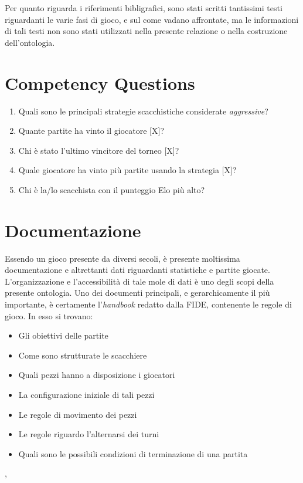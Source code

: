 \documentclass[12pt]{book}
\begin{document}
Per quanto riguarda i riferimenti bibligrafici, sono stati scritti
tantissimi testi riguardanti le varie fasi di gioco, e sul come vadano
affrontate, ma le informazioni di tali testi non sono stati utilizzati
nella presente relazione o nella costruzione dell'ontologia.


\chapter{Competency Questions}

\begin{enumerate}
  \item Quali sono le principali strategie scacchistiche considerate
\textit{aggressive}?

\item Quante partite ha vinto il giocatore [X]? 

\item Chi è stato l'ultimo vincitore del torneo [X]?

\item Quale giocatore ha vinto più partite usando la strategia [X]?
  
\item Chi è la/lo scacchista con il punteggio Elo più alto?

\end{enumerate}


\chapter{Documentazione}

Essendo un gioco presente da diversi secoli, è presente moltissima
documentazione e altrettanti dati riguardanti statistiche e partite
giocate. L'organizzazione e l'accessibilità di tale mole di dati è uno degli scopi della
presente ontologia. Uno dei documenti principali, e gerarchicamente il
più importante, è certamente l'\textit{handbook} redatto dalla FIDE,
contenente le regole di gioco. In esso si trovano:
\begin{itemize}

  \item Gli obiettivi delle partite
  \item Come sono strutturate le scacchiere
  \item Quali pezzi hanno a disposizione i giocatori
  \item La configurazione iniziale di tali pezzi
  \item Le regole di movimento dei pezzi
  \item Le regole riguardo l'alternarsi dei turni
  \item Quali sono le possibili condizioni di terminazione di una
    partita

\end{itemize}, 
\end{document}
